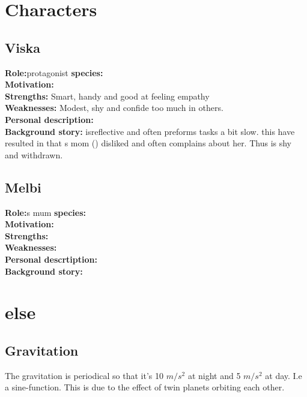 \documentclass{article}
\begin{document}
\section{Characters}%


\subsection{Viska} 
\label{Viska}
\textbf{Role:}protagonist
\textbf{species:} 
\\\textbf{Motivation:}
\\\textbf{Strengths:}  Smart, handy and good at feeling empathy%
\\\textbf{Weaknesses:} Modest, shy and confide too much in others.
\\\textbf{Personal description: }
\\\textbf{Background story:} 
   isreflective and often preforms tasks a bit slow. this have resulted in that s mom () disliked  and often complains about her. Thus  is shy and withdrawn.
 

\subsection{Melbi}  %
\label{Melbi}
\textbf{Role:}s mum
\textbf{species:} 
\\\textbf{Motivation:}
\\\textbf{Strengths:} %
\\\textbf{Weaknesses:}  
\\\textbf{Personal descrtiption:}
\\\textbf{Background story:} 



\section{else}%

\subsection{Gravitation}
\label{gravitation}
The gravitation is periodical so that it's 10 $m/s^2$ at night and 5 $m/s^2$ at day. I.e a sine-function. This is due to the effect of twin planets orbiting each other. \\
\end{document}
